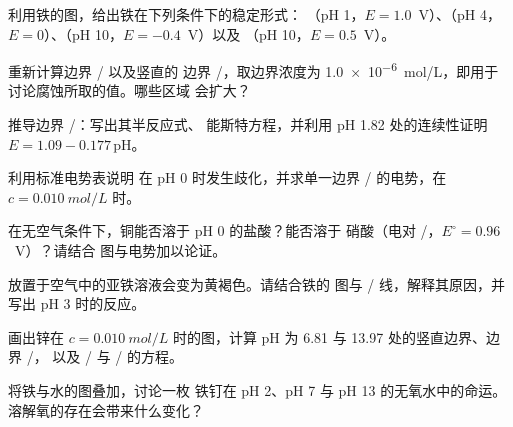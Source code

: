 \begin{exercise}[$\star$]\label{exo:b1:e-ph-diagrams:4}
利用铁的图，给出铁在下列条件下的稳定形式：
（pH 1，$E = 1.0$~V）、（pH 4，$E = 0$）、（pH 10，$E = -0.4$~V）以及
（pH 10，$E = 0.5$~V）。
\end{exercise}

\begin{exercise}[$\star\star$]\label{exo:b1:e-ph-diagrams:5}
重新计算边界 / 以及竖直的
边界 /，取边界浓度为
\qty{1.0e-6}{mol/L}，即用于讨论腐蚀所取的值。哪些区域
会扩大？
\end{exercise}

\begin{exercise}[$\star\star$]\label{exo:b1:e-ph-diagrams:6}
推导边界 /：写出其半反应式、
能斯特方程，并利用 pH 1.82 处的连续性证明 $E = 1.09 -
0.177\,\mathrm{pH}$。
\end{exercise}

\begin{exercise}[$\star\star$]\label{exo:b1:e-ph-diagrams:7}
利用标准电势表说明  在
pH 0 时发生歧化，并求单一边界 /
的电势，在 $c = \qty{0.010}{mol/L}$ 时。
\end{exercise}

\begin{exercise}[$\star\star$]\label{exo:b1:e-ph-diagrams:8}
在无空气条件下，铜能否溶于 pH 0 的盐酸？能否溶于
硝酸（电对 /，$E^\circ = 0.96$~V）？请结合
图与电势加以论证。
\end{exercise}

\begin{exercise}[$\star\star$]\label{exo:b1:e-ph-diagrams:9}
放置于空气中的亚铁溶液会变为黄褐色。请结合铁的
      图与 / 线，解释其原因，并写出 pH 3 时的反应。
\end{exercise}

\begin{exercise}[$\star\star\star$]\label{exo:b1:e-ph-diagrams:10}
画出锌在 $c = \qty{0.010}{mol/L}$ 时的图，计算
pH 为 6.81 与 13.97 处的竖直边界、边界 /，
以及 / 与 / 的方程。
\end{exercise}

\begin{exercise}[$\star\star\star$]\label{exo:b1:e-ph-diagrams:11}
将铁与水的图叠加，讨论一枚
铁钉在 pH 2、pH 7 与 pH 13 的无氧水中的命运。
溶解氧的存在会带来什么变化？
\end{exercise}

